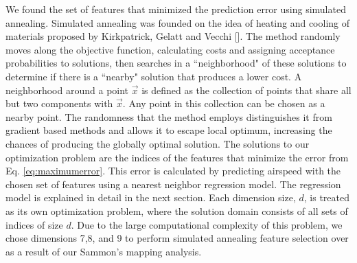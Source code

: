 \documentclass[]{aiaa-tc}
\begin{document}
We found the set of features that minimized the prediction error using simulated annealing. Simulated annealing was founded on the idea of heating and cooling of materials proposed by Kirkpatrick, Gelatt and Vecchi []. The method randomly moves along the objective function, calculating costs and assigning acceptance probabilities to solutions, then searches in a ``neighborhood" of these solutions to determine if there is a ``nearby" solution that produces a lower cost. A neighborhood around a point $\vec{x}$ is defined as the collection of points that share all but two components with $\vec{x}$. Any point in this collection can be chosen as a nearby point. The randomness that the method employs distinguishes it from gradient based methods and allows it to escape local optimum, increasing the chances of producing the globally optimal solution. The solutions to our optimization problem are the indices of the features that minimize the error from Eq. \ref{eq:maximumerror}. This error is calculated by predicting airspeed with the chosen set of features using a nearest neighbor regression model. The regression model is explained in detail in the next section. Each dimension size, $d$, is treated as its own optimization problem, where the solution domain consists of all sets of indices of size $d$. Due to the large computational complexity of this problem, we chose dimensions 7,8, and 9 to perform simulated annealing feature selection over as a result of our Sammon's mapping analysis. 

 
\end{document}
